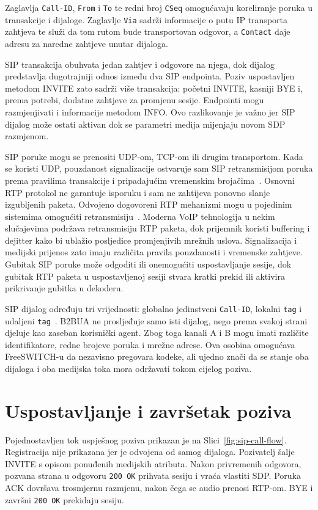 Zaglavlja \texttt{Call-ID}, \texttt{From} i \texttt{To} te redni broj \texttt{CSeq} omogućavaju koreliranje poruka u transakcije i dijaloge. Zaglavlje \texttt{Via} sadrži informacije o putu IP transporta zahtjeva te služi da tom rutom bude transportovan odgovor, a \texttt{Contact} daje adresu za naredne zahtjeve unutar dijaloga.

SIP transakcija obuhvata jedan zahtjev i odgovore na njega, dok dijalog predstavlja dugotrajniji odnos između dva SIP endpointa. Poziv uspostavljen metodom INVITE zato sadrži više transakcija: početni INVITE, kasniji BYE i, prema potrebi, dodatne zahtjeve za promjenu sesije. Endpointi mogu razmjenjivati i informacije metodom INFO. Ovo razlikovanje je važno jer SIP dijalog može ostati aktivan dok se parametri medija mijenjaju novom SDP razmjenom.

SIP poruke mogu se prenositi UDP-om, TCP-om ili drugim transportom. Kada se koristi UDP, pouzdanost signalizacije ostvaruje sam SIP retransmisijom poruka prema pravilima transakcije i pripadajućim vremenskim brojačima~\cite{rfc3261}. Osnovni RTP protokol ne garantuje isporuku i sam ne zahtijeva ponovno slanje izgubljenih paketa. Odvojeno dogovoreni RTP mehanizmi mogu u pojedinim sistemima omogućiti retransmisiju~\cite{rfc4588}. Moderna VoIP tehnologija u nekim slučajevima podržava retransmisiju RTP paketa, dok prijemnik koristi buffering i dejitter kako bi ublažio posljedice promjenjivih mrežnih uslova. Signalizacija i medijski prijenos zato imaju različita pravila pouzdanosti i vremenske zahtjeve. Gubitak SIP poruke može odgoditi ili onemogućiti uspostavljanje sesije, dok gubitak RTP paketa u uspostavljenoj sesiji stvara kratki prekid ili aktivira prikrivanje gubitka u dekoderu.

SIP dijalog određuju tri vrijednosti: globalno jedinstveni \texttt{Call-ID}, lokalni \texttt{tag} i udaljeni \texttt{tag}~\cite{rfc3261}. B2BUA ne prosljeđuje samo isti dijalog, nego prema svakoj strani djeluje kao zaseban korisnički agent. Zbog toga kanali A i B mogu imati različite identifikatore, redne brojeve poruka i mrežne adrese. Ova osobina omogućava FreeSWITCH-u da nezavisno pregovara kodeke, ali ujedno znači da se stanje oba dijaloga i oba medijska toka mora održavati tokom cijelog poziva.

\section{Uspostavljanje i završetak poziva}

Pojednostavljen tok uspješnog poziva prikazan je na Slici~\ref{fig:sip-call-flow}. Registracija nije prikazana jer je odvojena od samog dijaloga. Pozivatelj šalje INVITE s opisom ponuđenih medijskih atributa. Nakon privremenih odgovora, pozvana strana u odgovoru \texttt{200 OK} prihvata sesiju i vraća vlastiti SDP. Poruka ACK dovršava trosmjernu razmjenu, nakon čega se audio prenosi RTP-om. BYE i završni \texttt{200 OK} prekidaju sesiju.

